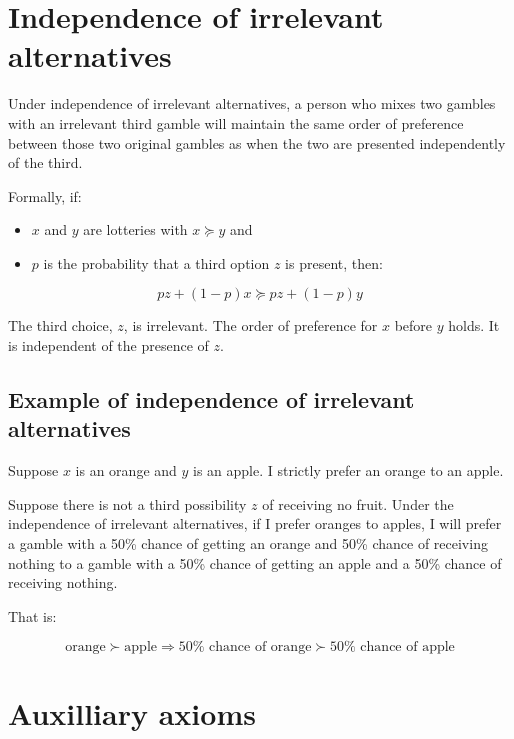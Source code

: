 \documentclass[
  letterpaper,
  DIV=11,
  numbers=noendperiod]{scrreprt}
\providecommand{\tightlist}{%
  \setlength{\itemsep}{0pt}\setlength{\parskip}{0pt}}\usepackage{longtable,booktabs,array}
\begin{document}
\hypertarget{sec-independence}{%
\section{Independence of irrelevant
alternatives}\label{sec-independence}}

Under independence of irrelevant alternatives, a person who mixes two
gambles with an irrelevant third gamble will maintain the same order of
preference between those two original gambles as when the two are
presented independently of the third.

Formally, if:

\begin{itemize}
\tightlist
\item
  \(x\) and \(y\) are lotteries with \(x\succcurlyeq y\) and
\item
  \(p\) is the probability that a third option \(z\) is present, then:
\end{itemize}

\[pz+(1-p)x\succcurlyeq pz+(1-p)y\]

The third choice, \(z\), is irrelevant. The order of preference for
\(x\) before \(y\) holds. It is independent of the presence of \(z\).

\hypertarget{example-of-independence-of-irrelevant-alternatives}{%
\subsection{Example of independence of irrelevant
alternatives}\label{example-of-independence-of-irrelevant-alternatives}}

Suppose \(x\) is an orange and \(y\) is an apple. I strictly prefer an
orange to an apple.

Suppose there is not a third possibility \(z\) of receiving no fruit.
Under the independence of irrelevant alternatives, if I prefer oranges
to apples, I will prefer a gamble with a 50\% chance of getting an
orange and 50\% chance of receiving nothing to a gamble with a 50\%
chance of getting an apple and a 50\% chance of receiving nothing.

That is:

\[\text{orange}\succ \text{apple}  \Longrightarrow 50\% \text{ chance of orange}\succ 50\% \text{ chance of apple}\]

\hypertarget{auxilliary-axioms}{%
\section{Auxilliary axioms}\label{auxilliary-axioms}}
\end{document}
